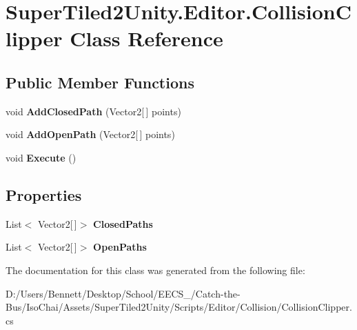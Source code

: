 \hypertarget{class_super_tiled2_unity_1_1_editor_1_1_collision_clipper}{}\section{Super\+Tiled2\+Unity.\+Editor.\+Collision\+Clipper Class Reference}
\label{class_super_tiled2_unity_1_1_editor_1_1_collision_clipper}
\subsection*{Public Member Functions}
\begin{DoxyCompactItemize}
\item 
\mbox{\label{class_super_tiled2_unity_1_1_editor_1_1_collision_clipper_a62952b93d9c717ec9b8fc0f358b0425f}} 
void {\bfseries Add\+Closed\+Path} (Vector2\mbox{[}$\,$\mbox{]} points)
\item 
\mbox{\label{class_super_tiled2_unity_1_1_editor_1_1_collision_clipper_a604a9daf24d76df98d11a56493327edf}} 
void {\bfseries Add\+Open\+Path} (Vector2\mbox{[}$\,$\mbox{]} points)
\item 
\mbox{\label{class_super_tiled2_unity_1_1_editor_1_1_collision_clipper_a10557eb2dd64e43b8bbf663acb3baf5e}} 
void {\bfseries Execute} ()
\end{DoxyCompactItemize}
\subsection*{Properties}
\begin{DoxyCompactItemize}
\item 
\mbox{\label{class_super_tiled2_unity_1_1_editor_1_1_collision_clipper_a9148c4cc8d66465552d23813ed900e8a}} 
List$<$ Vector2\mbox{[}$\,$\mbox{]}$>$ {\bfseries Closed\+Paths}
\item 
\mbox{\label{class_super_tiled2_unity_1_1_editor_1_1_collision_clipper_aebd6c1db17174fce2c8e18c41f0d6d83}} 
List$<$ Vector2\mbox{[}$\,$\mbox{]}$>$ {\bfseries Open\+Paths}
\end{DoxyCompactItemize}


The documentation for this class was generated from the following file\+:\begin{DoxyCompactItemize}
\item 
D\+:/\+Users/\+Bennett/\+Desktop/\+School/\+E\+E\+C\+S\+\_/\+Catch-\/the-\/\+Bus/\+Iso\+Chai/\+Assets/\+Super\+Tiled2\+Unity/\+Scripts/\+Editor/\+Collision/Collision\+Clipper.\+cs\end{DoxyCompactItemize}

